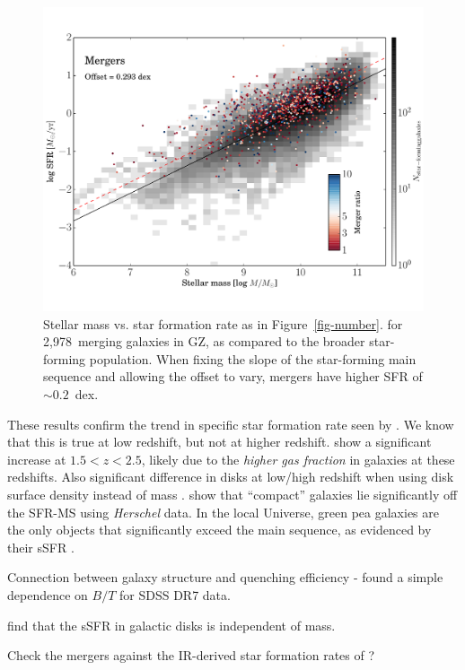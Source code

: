 \documentclass{emulateapj}
\begin{document}
\begin{figure}
\includegraphics[angle=0,width=7.0in]{figures/ms_mergers.pdf}
\caption{Stellar mass vs. star formation rate  as in Figure~\ref{fig-number}. for 2,978~merging galaxies in GZ, as compared to the broader star-forming population. When fixing the slope of the star-forming main sequence and allowing the offset to vary, mergers have higher SFR of $\sim0.2$~dex.
\label{fig-mergers}}
\end{figure}

These results confirm the trend in specific star formation rate seen by \citet{dar10}. We know that this is true at low redshift, but not at higher redshift. \citet{rod11} show a significant increase at $1.5<z<2.5$, likely due to the \emph{higher gas fraction} in galaxies at these redshifts. Also significant difference in disks at low/high redshift when using disk surface density instead of mass \citep{dad10}. \citet{elb11} show that ``compact'' galaxies lie significantly off the SFR-MS using {\it Herschel} data. In the local Universe, green pea galaxies are the only objects that significantly exceed the main sequence, as evidenced by their sSFR \citep{car09}. 

Connection between galaxy structure and quenching efficiency - \citet{oma14} found a simple dependence on $B/T$ for SDSS DR7 data. 

\citet{abr14} find that the sSFR in galactic disks is independent of mass. 

Check the mergers against the IR-derived star formation rates of \citet{jar13}?
\end{document}
